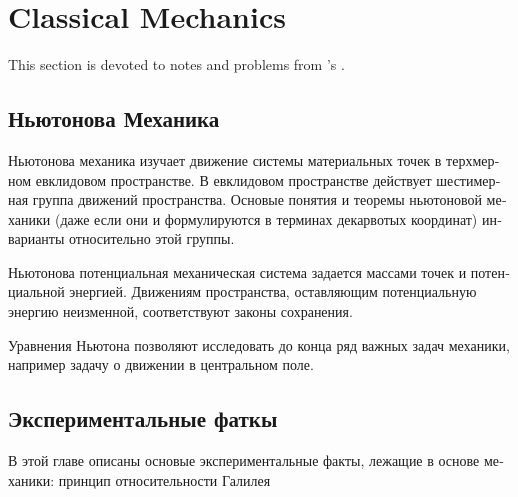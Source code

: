 \chapter{Classical Mechanics}
This section is devoted to notes and problems from 's \emph{}
\cite{arnold}.

\begin{otherlanguage}{russian}
\section{Ньютонова Механика}
Ньютонова механика изучает движение системы материальных точек в терхмерном
евклидовом пространстве. В евклидовом пространстве действует шестимерная
группа движений пространства. Основые понятия и теоремы ньютоновой механики
(даже если они и формулируются в терминах декарвотых координат) инварианты
относительно этой группы.

Ньютонова потенциальная механическая система задается массами точек и
потенциальной энергией. Движениям пространства, оставляющим потенциальную
энергию неизменной, соответствуют законы сохранения.

Уравнения Ньютона позволяют исследовать до конца ряд важных задач механики,
например задачу о движении в центральном поле.

\section{Экспериментальные фаткы}
В этой главе  описаны основые экспериментальные факты, лежащие в основе
механики: принцип относительности Галилея
\end{otherlanguage}

